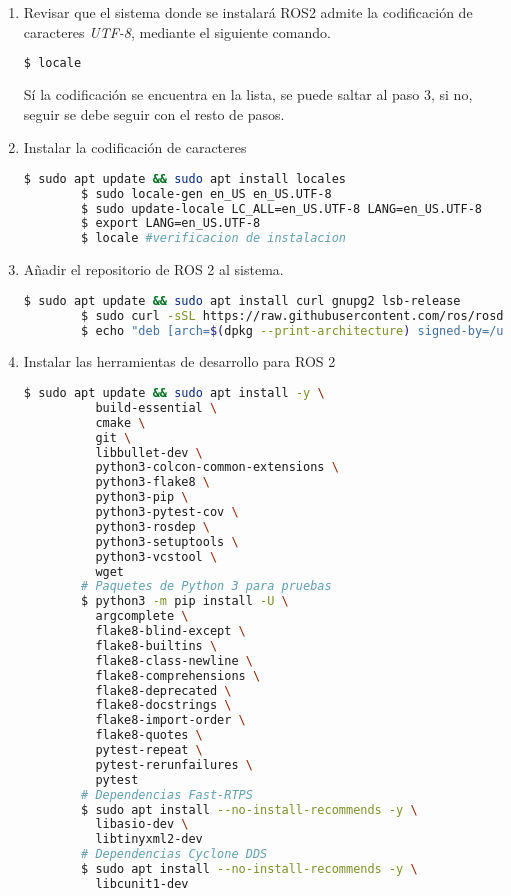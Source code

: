 \begin{enumerate}
    \item Revisar que el sistema donde se instalará ROS2 admite la codificación de caracteres \textit{UTF-8}, mediante el siguiente comando.

    \begin{lstlisting}[language = bash]
        $ locale
    \end{lstlisting}

    Sí la codificación se encuentra en la lista, se puede saltar al paso 3, si no, seguir se debe seguir con el resto de pasos.

    \item Instalar la codificación de caracteres

    \begin{lstlisting}[language = bash]
        $ sudo apt update && sudo apt install locales
        $ sudo locale-gen en_US en_US.UTF-8
        $ sudo update-locale LC_ALL=en_US.UTF-8 LANG=en_US.UTF-8
        $ export LANG=en_US.UTF-8
        $ locale #verificacion de instalacion
    \end{lstlisting}

    \item Añadir el repositorio de ROS 2 al sistema. 
    
    \begin{lstlisting}[language = bash]
        $ sudo apt update && sudo apt install curl gnupg2 lsb-release
        $ sudo curl -sSL https://raw.githubusercontent.com/ros/rosdistro/master/ros.key  -o /usr/share/keyrings/ros-archive-keyring.gpg
        $ echo "deb [arch=$(dpkg --print-architecture) signed-by=/usr/share/keyrings/ros-archive-keyring.gpg] http://packages.ros.org/ros2/ubuntu $(lsb_release -cs) main" | sudo tee /etc/apt/sources.list.d/ros2.list > /dev/null
    \end{lstlisting}

    \item Instalar las herramientas de desarrollo para ROS 2

    \begin{lstlisting}[language = bash]
        $ sudo apt update && sudo apt install -y \
          build-essential \
          cmake \
          git \
          libbullet-dev \
          python3-colcon-common-extensions \
          python3-flake8 \
          python3-pip \
          python3-pytest-cov \
          python3-rosdep \
          python3-setuptools \
          python3-vcstool \
          wget
        # Paquetes de Python 3 para pruebas
        $ python3 -m pip install -U \
          argcomplete \
          flake8-blind-except \
          flake8-builtins \
          flake8-class-newline \
          flake8-comprehensions \
          flake8-deprecated \
          flake8-docstrings \
          flake8-import-order \
          flake8-quotes \
          pytest-repeat \
          pytest-rerunfailures \
          pytest
        # Dependencias Fast-RTPS
        $ sudo apt install --no-install-recommends -y \
          libasio-dev \
          libtinyxml2-dev
        # Dependencias Cyclone DDS
        $ sudo apt install --no-install-recommends -y \
          libcunit1-dev
    \end{lstlisting}


\end{enumerate}
